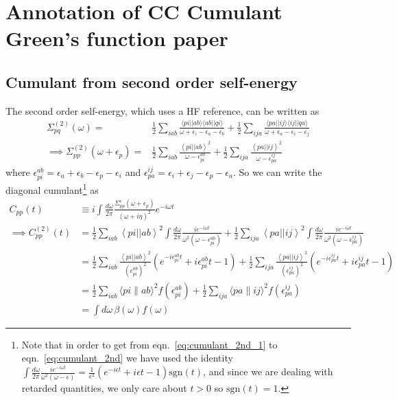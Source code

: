 \section{Annotation of CC Cumulant Green's function paper}
\subsection{Cumulant from second order self-energy}
The second order self-energy, which uses a HF reference, can be written as
\begin{align}
\Sigma_{pq}^{(2)}(\omega) =& \frac{1}{2} \sum_{iab} \frac{\langle pi || ab \rangle \langle ab || qi \rangle}{\omega + \epsilon_i - \epsilon_a - \epsilon_b} + \frac{1}{2} \sum_{ija} \frac{\langle pa || ij \rangle \langle ij || qa \rangle}{\omega + \epsilon_a - \epsilon_i - \epsilon_j} \\
\implies \Sigma_{pp}^{(2)}(\omega+\epsilon_p) =&
\frac{1}{2} \sum_{iab}
\frac{\left< pi \left| \right| ab \right>^2}
{\omega-\epsilon_{pi}^{ab}} + \frac{1}{2} \sum_{ija}
\frac{\left< pa \left| \right| ij \right>^2}
{\omega-\epsilon_{pa}^{ij}}
\end{align}
where
$\epsilon_{pi}^{ab} = \epsilon_{a}+\epsilon_{b}-\epsilon_{p}-\epsilon_{i}$
and
$\epsilon_{pa}^{ij} = \epsilon_{i}+\epsilon_{j}-\epsilon_{p}-\epsilon_{a}$. So we can write the diagonal cumulant\footnote{ 
Note that in order to get from eqn.~\ref{eq:cumulant_2nd_1} to eqn.~\ref{eq:cumulant_2nd} we have used the identity $\int \frac{d\omega}{2\pi} \frac{i e^{-i \omega t}}{\omega^2\left(\omega-\epsilon\right)} = \frac{1}{\epsilon^2} \left(e^{-i \epsilon t} +i \epsilon t -1 \right) \mathrm{sgn}(t)$, and since we are dealing with retarded quantities, we only care about $t>0$ so $\mathrm{sgn}(t) = 1$.} as
\begin{align}
C_{pp}(t) &\equiv i \int \frac{d\omega}{2\pi} \frac{ \Sigma_{pp}^c\left(\omega+\epsilon_p\right)}{(\omega + i \eta)^2} e^{-i \omega t} \\
\implies C_{pp}^{(2)}(t) &= \frac{1}{2} \sum_{iab} \left< pi \left| \right| ab \right>^2 \int \frac{d\omega}{2\pi} \frac{i e^{-i \omega t}}{\omega^2\left(\omega-\epsilon_{pi}^{ab}\right)} + \frac{1}{2} \sum_{ija} \left< pa \left| \right| ij \right>^2 \int \frac{d\omega}{2\pi} \frac{i e^{-i \omega t}}{\omega^2\left(\omega-\epsilon_{pa}^{ij}\right)} 
\label{eq:cumulant_2nd_1}
\\
&= \frac{1}{2}\sum_{iab} \frac{\left< pi \left| \right| ab \right>^2}{\left(\epsilon_{pi}^{ab}\right)^2}
\left(e^{-i \epsilon_{pi}^{ab} t} +i \epsilon_{pi}^{ab} t -1 \right)
+\frac{1}{2}\sum_{ija} \frac{\left< pa \left| \right| ij \right>^2}{\left(\epsilon_{pa}^{ij}\right)^2}
\left(e^{-i \epsilon_{pa}^{ij} t} +i \epsilon_{pa}^{ij} t -1 \right) 
\label{eq:cumulant_2nd}
\\
&= \frac{1}{2} \sum_{i a b}\langle p i \| a b\rangle^2 f\left(\epsilon_{p i}^{a b}\right)+\frac{1}{2} \sum_{i j a}\langle p a \| i j\rangle^2 f\left(\epsilon_{p a}^{i j}\right)\\
&= \int d\omega\, \beta(\omega) f(\omega)
\end{align}
